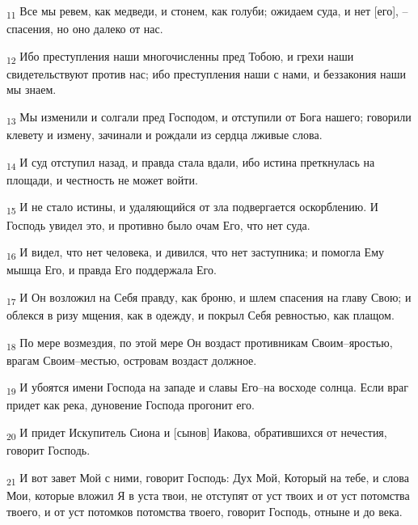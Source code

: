 \begin{tcolorbox}
\textsubscript{11} Все мы ревем, как медведи, и стонем, как голуби; ожидаем суда, и нет [его], --спасения, но оно далеко от нас.
\end{tcolorbox}
\begin{tcolorbox}
\textsubscript{12} Ибо преступления наши многочисленны пред Тобою, и грехи наши свидетельствуют против нас; ибо преступления наши с нами, и беззакония наши мы знаем.
\end{tcolorbox}
\begin{tcolorbox}
\textsubscript{13} Мы изменили и солгали пред Господом, и отступили от Бога нашего; говорили клевету и измену, зачинали и рождали из сердца лживые слова.
\end{tcolorbox}
\begin{tcolorbox}
\textsubscript{14} И суд отступил назад, и правда стала вдали, ибо истина преткнулась на площади, и честность не может войти.
\end{tcolorbox}
\begin{tcolorbox}
\textsubscript{15} И не стало истины, и удаляющийся от зла подвергается оскорблению. И Господь увидел это, и противно было очам Его, что нет суда.
\end{tcolorbox}
\begin{tcolorbox}
\textsubscript{16} И видел, что нет человека, и дивился, что нет заступника; и помогла Ему мышца Его, и правда Его поддержала Его.
\end{tcolorbox}
\begin{tcolorbox}
\textsubscript{17} И Он возложил на Себя правду, как броню, и шлем спасения на главу Свою; и облекся в ризу мщения, как в одежду, и покрыл Себя ревностью, как плащом.
\end{tcolorbox}
\begin{tcolorbox}
\textsubscript{18} По мере возмездия, по этой мере Он воздаст противникам Своим--яростью, врагам Своим--местью, островам воздаст должное.
\end{tcolorbox}
\begin{tcolorbox}
\textsubscript{19} И убоятся имени Господа на западе и славы Его--на восходе солнца. Если враг придет как река, дуновение Господа прогонит его.
\end{tcolorbox}
\begin{tcolorbox}
\textsubscript{20} И придет Искупитель Сиона и [сынов] Иакова, обратившихся от нечестия, говорит Господь.
\end{tcolorbox}
\begin{tcolorbox}
\textsubscript{21} И вот завет Мой с ними, говорит Господь: Дух Мой, Который на тебе, и слова Мои, которые вложил Я в уста твои, не отступят от уст твоих и от уст потомства твоего, и от уст потомков потомства твоего, говорит Господь, отныне и до века.
\end{tcolorbox}
